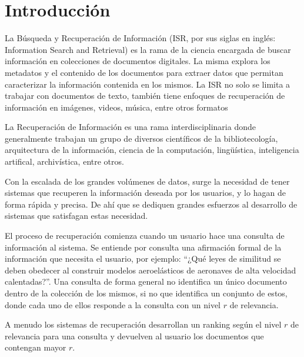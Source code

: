 \section{Introducción}

La Búsqueda y Recuperación de Información (ISR, por sus siglas en inglés: Information Search and Retrieval) es la rama de la ciencia encargada de buscar información en colecciones de documentos digitales. La misma explora los metadatos y el contenido de los documentos para extraer datos que permitan caracterizar la información contenida en los mismos. La ISR no solo se limita a trabajar con documentos de texto, también tiene enfoques de recuperación de información en imágenes, videos, música, entre otros formatos \cite{mri} 

La Recuperación de Información es una rama interdisciplinaria donde generalmente trabajan un grupo de diversos científicos de la bibliotecología, arquitectura de la información, ciencia de la computación, lingüística, inteligencia artifical, archivística, entre otros.

Con la escalada de los grandes volúmenes de datos, surge la necesidad de tener sistemas que recuperen la información deseada por los usuarios, y lo hagan de forma rápida y precisa. De ahí que se dediquen grandes esfuerzos al desarrollo de sistemas que satisfagan estas necesidad.

El proceso de recuperación comienza cuando un usuario hace una consulta de información al sistema. Se entiende por consulta una afirmación formal de la información que necesita el usuario, por ejemplo: ``¿Qué leyes de similitud se deben obedecer al construir modelos aeroelásticos de aeronaves de alta velocidad calentadas?''. Una consulta de forma general no identifica un único documento dentro de la colección de los mismos, si no que identifica un conjunto de estos, donde cada uno de ellos responde a la consulta con un nivel $r$ de relevancia. 

A menudo los sistemas de recuperación desarrollan un ranking según el nivel $r$ de relevancia para una consulta y devuelven al usuario los documentos que contengan mayor $r$.